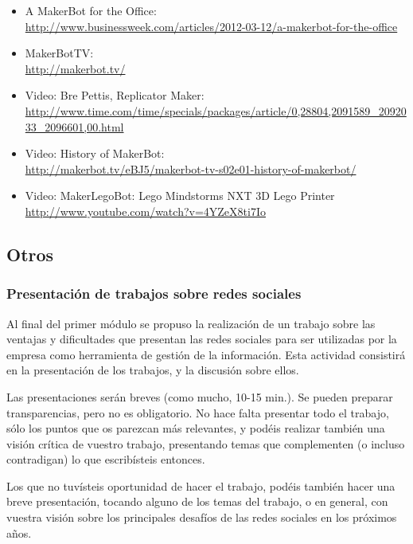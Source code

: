 \documentclass[a4paper,12pt]{article}
\begin{document}
\begin{itemize}
\item A MakerBot for the Office: \\
  \url{http://www.businessweek.com/articles/2012-03-12/a-makerbot-for-the-office}
\item MakerBotTV: \\
  \url{http://makerbot.tv/}
\item Video: Bre Pettis, Replicator Maker: \\
  \url{http://www.time.com/time/specials/packages/article/0,28804,2091589_2092033_2096601,00.html}
\item Video: History of MakerBot: \\
  \url{http://makerbot.tv/eBJ5/makerbot-tv-s02e01-history-of-makerbot/}
\item Video: MakerLegoBot: Lego Mindstorms NXT 3D Lego Printer \\
  \url{http://www.youtube.com/watch?v=4YZeX8ti7Io}
\end{itemize}

\subsection{Otros}

\subsubsection{Presentación de trabajos sobre redes sociales}
\label{sub:trabajos-redes-sociales}

Al final del primer módulo se propuso la realización de un trabajo sobre las ventajas y dificultades que presentan las redes sociales para ser utilizadas por la empresa como herramienta de gestión de la información. Esta actividad consistirá en la presentación de los trabajos, y la discusión sobre ellos.

Las presentaciones serán breves (como mucho, 10-15 min.). Se pueden preparar transparencias, pero no es obligatorio. No hace falta presentar todo el trabajo, sólo los puntos que os parezcan más relevantes, y podéis realizar también una visión crítica de vuestro trabajo, presentando temas que complementen (o incluso contradigan) lo que escribísteis entonces.

Los que no tuvísteis oportunidad de hacer el trabajo, podéis también hacer una breve presentación, tocando alguno de los temas del trabajo, o en general, con vuestra visión sobre los principales desafíos de las redes sociales en los próximos años.
\end{document}
